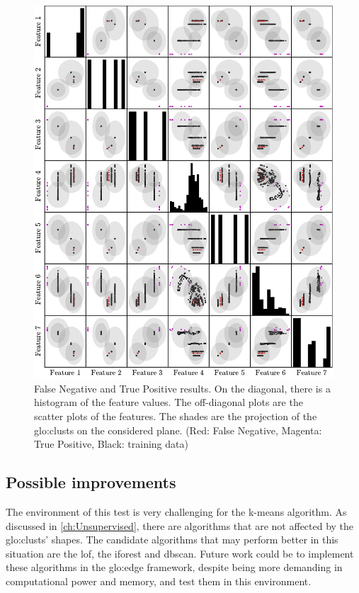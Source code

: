 \begin{figure}
    \centering
    \includegraphics{Images/shaker/ConfusionMatrix.pdf}
    \caption{False Negative and True Positive results. On the diagonal, there is a histogram of the feature values. The off-diagonal plots are the scatter plots of the features. The shades are the projection of the \gls{glo:clust}s on the considered plane. (Red: False Negative, Magenta: True Positive, Black: training data)}
    \label{fig:shaker_conf_matrix}
\end{figure}
\clearpage

\subsection{Possible improvements}
The environment of this test is very challenging for the k-means algorithm. As discussed in \autoref{ch:Unsupervised}, there are algorithms that are not affected by the \gls{glo:clust}s' shapes. The candidate algorithms that may perform better in this situation are the \gls{lof}, the \gls{iforest} and \gls{dbscan}. Future work could be to implement these algorithms in the \gls{glo:edge} framework, despite being more demanding in computational power and memory, and test them in this environment.

